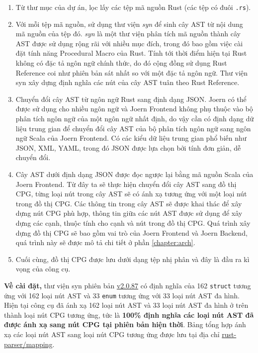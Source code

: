 \begin{enumerate}
	\item Từ thư mục của dự án, lọc lấy các tệp mã nguồn Rust (các tệp có đuôi \texttt{.rs}).
	\item Với mỗi tệp mã nguồn, sử dụng thư viện \textit{syn} \cite{synRust} để sinh cây AST từ nội dung mã nguồn của tệp đó.
	\textit{syn} là một thư viện phân tích mã nguồn thành cây AST được sử dụng rộng rãi với nhiều mục đích, trong đó bao gồm việc cài đặt tính năng Procedural Macro \cite{rustlangProceduralMacros} của Rust.
	Tính tới thời điểm hiện tại Rust không có đặc tả ngôn ngữ chính thức, do đó cộng đồng sử dụng Rust Reference \cite{rustReference} coi như phiên bản sát nhất so với một đặc tả ngôn ngữ.
	Thư viện syn xây dựng định nghĩa các nút của cây AST tuân theo Rust Reference.
	\item Chuyển đổi cây AST từ ngôn ngữ Rust sang định dạng JSON.
	Joern có thể được sử dụng cho nhiều ngôn ngữ và Joern Frontend không phụ thuộc vào bộ phân tích ngôn ngữ của một ngôn ngữ nhất định, do vậy cần có định dạng dữ liệu trung gian để chuyển đổi cây AST của bộ phân tích ngôn ngữ sang ngôn ngữ Scala của Joern Frontend.
	Có các kiểu dữ liệu trung gian phổ biến như JSON, XML, YAML, trong đó JSON được lựa chọn bởi tính đơn giản, dễ chuyển đổi.
	\item Cây AST dưới định dạng JSON được đọc ngược lại bằng mã nguồn Scala của Joern Frontend.
	Từ đây ta sẽ thực hiện chuyển đổi cây AST sang đồ thị CPG, từng loại nút trong cây AST sẽ có ánh xạ tương ứng với một loại nút trong đồ thị CPG.
	Các thông tin trong cây AST sẽ được khai thác để xây dựng nút CPG phù hợp, thông tin giữa các nút AST được sử dụng để xây dựng các cạnh, thuộc tính cho cạnh và nút trong đồ thị CPG.
	Quá trình xây dựng đồ thị CPG sẽ bao gồm vai trò của Joern Frontend và Joern Backend, quá trình này sẽ được mô tả chi tiết ở phần \ref{chapter:arch}.
	\item Cuối cùng, đồ thị CPG được lưu dưới dạng tệp nhị phân và đây là đầu ra kì vọng của công cụ.
\end{enumerate}

\textbf{Về cài đặt,} thư viện syn phiên bản \href{https://docs.rs/syn/2.0.87/syn/}{v2.0.87} có định nghĩa của 162 \texttt{struct} tương ứng với 162 loại nút AST và 33 \texttt{enum} tương ứng với 33 loại nút AST đa hình.
Hiện tại công cụ đã ánh xạ 162 loại nút AST và 33 loại nút AST đa hình ở trên thành loại nút CPG tương ứng, tức là \textbf{100\% định nghĩa các loại nút AST đã được ánh xạ sang nút CPG tại phiên bản hiện thời}.
Bảng tổng hợp ánh xạ các loại nút AST sang loại nút CPG tương ứng được lưu tại địa chỉ \href{https://github.com/congnghiahieu/rust-parser/blob/master/docs/MAPPING.md}{rust-parser/mapping}.

